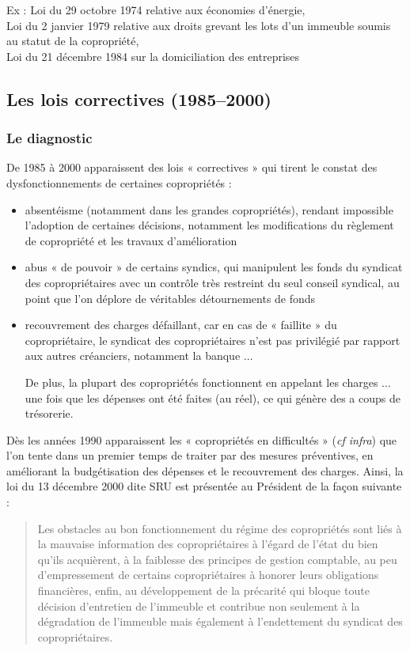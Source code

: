 			Ex : Loi du 29 octobre 1974 relative aux économies d'énergie,\\
			Loi du 2 janvier 1979 relative aux droits grevant les lots d'un immeuble soumis au statut de la copropriété,\\
			Loi du 21 décembre 1984 sur la domiciliation des entreprises
		
		\subsection{Les lois correctives (1985--2000)}
		
			\subsubsection{Le diagnostic}
				De 1985 à 2000 apparaissent des lois « correctives » qui tirent le constat des dysfonctionnements de certaines copropriétés :
				\begin{itemize}
					\item 	absentéisme (notamment dans les grandes copropriétés), rendant impossible l’adoption de certaines décisions, notamment les modifications du règlement de copropriété et les travaux d’amélioration
					\item  abus « de pouvoir » de certains syndics, qui manipulent les fonds du syndicat des copropriétaires avec un contrôle très restreint du seul conseil syndical, au point que l’on déplore de véritables détournements de fonds
					\item  recouvrement des charges défaillant, car en cas de « faillite » du copropriétaire, le syndicat des copropriétaires n’est pas privilégié par rapport aux autres créanciers, notamment la banque $\dots$
					
					De plus, la plupart des copropriétés fonctionnent en appelant les charges $\dots$ une fois que les dépenses ont été faites (au réel), ce qui génère des a coups de trésorerie.
				\end{itemize}
				Dès les années 1990 apparaissent les « copropriétés en difficultés » (\emph{cf infra}) que l’on tente dans un premier temps de traiter par des mesures préventives, en améliorant la budgétisation des dépenses et le recouvrement des charges.
				Ainsi, la loi du 13 décembre 2000 dite SRU est présentée au Président de la façon suivante :
				\begin{quote}
					Les obstacles au bon fonctionnement du régime des copropriétés sont liés à la mauvaise information des copropriétaires à l'égard de l'état du bien qu'ils acquièrent, à la faiblesse des principes de gestion comptable, au peu d'empressement de certains copropriétaires à honorer leurs obligations financières, enfin, au développement de la précarité qui bloque toute décision d'entretien de l'immeuble et contribue
					non seulement à la dégradation de l'immeuble mais également à l'endettement du syndicat des copropriétaires.
				\end{quote}
				
